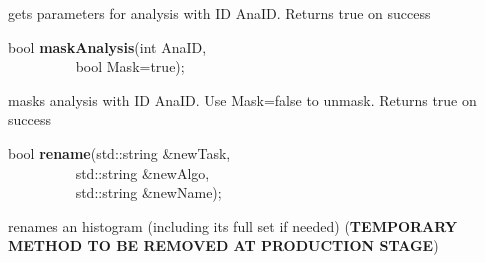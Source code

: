  gets parameters for analysis with ID AnaID. Returns true on success


\item    bool {\bf maskAnalysis}(int AnaID,\\\mbox{}~~~~~~~~~
                    bool Mask=true);

 masks analysis with ID AnaID. Use Mask=false to unmask. Returns true on success


\item    bool {\bf rename}(std::string \&newTask,\\\mbox{}~~~~~~~~~
              std::string \&newAlgo,\\\mbox{}~~~~~~~~~
              std::string \&newName);

 renames an histogram (including its full set if needed) 
 ({\bf TEMPORARY METHOD TO BE REMOVED AT PRODUCTION STAGE})


